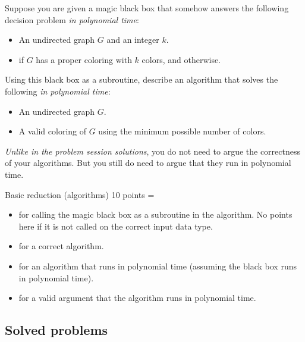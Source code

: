 \documentclass[11pt]{article}
\begin{document}
\begin{enumerate}
Suppose you are given a magic black box that somehow answers the following
decision problem \emph{in polynomial time}:
\begin{itemize}
\item {} An undirected graph $G$ and an integer $k$.
\item {}  if $G$ has a proper coloring with $k$ colors, and  otherwise.
\end{itemize}
Using this black box as a subroutine, describe an algorithm that solves the
following  \emph{in polynomial time}:
\begin{itemize}
\item {} An undirected graph $G$.
\item {} A valid coloring of $G$ using the minimum possible number
of colors.
\end{itemize}

\emph{Unlike in the problem session solutions}, you do not need to argue the
correctness of your algorithms. But you still do need to argue that they run in
polynomial time.

\end{enumerate}

\begin{Rubric}{Basic reduction (algorithms)}
10 points =
\begin{itemize}
\item[+ 4] for calling the magic black box as a subroutine in the algorithm. No points here if it is not called on the correct input data type.
\item[+ 2] for a correct algorithm.
\item[+ 2] for an algorithm that runs in polynomial time (assuming the black box runs in polynomial time).
\item[+ 2] for a valid argument that the algorithm runs in polynomial time.
\end{itemize}
\end{Rubric}



\newpage

\subsection*{Solved problems}
\end{document}
